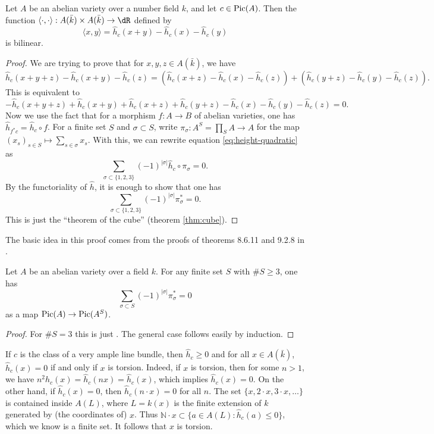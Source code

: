 \documentclass{article}
\begin{document}
\begin{lemma}\label{lem:height-quadratic}
Let $A$ be an abelian variety over a number field $k$, and let $c\in \operatorname{Pic}(A)$. 
Then the function 
$\langle \cdot,\cdot\rangle:A(\bar k)\times A(\bar k)\to \dR$ defined by 
\[
  \langle x,y\rangle = \widehat h_c(x+y)-\widehat h_c(x)-\widehat h_c(y)
\]
is bilinear. 
\end{lemma}
\begin{proof}
We are trying to prove that for $x,y,z\in A(\bar k)$, we have 
\[
  \widehat h_c(x+y+z)-\widehat h_c(x+y)-\widehat h_c(z) = \left(\widehat h_c(x+z)-\widehat h_c(x)-\widehat h_c(z)\right) + \left(\widehat h_c(y+z)-\widehat h_c(y)-\widehat h_c(z)\right) \text{.}
\]
This is equivalent to 
\begin{equation}\label{eq:height-quadratic}
  -\widehat h_c(x+y+z)+\widehat h_c(x+y)+\widehat h_c(x+z)+\widehat h_c(y+z)-\widehat h_c(x)-\widehat h_c(y)-\widehat h_c(z) = 0 \text{.}
\end{equation}
Now we use the fact that for a morphism $f:A\to B$ of abelian varieties, one has 
$\widehat h_{f^\ast c}=\widehat h_c\circ f$. For a finite set $S$ and 
$\sigma\subset S$, write $\pi_\sigma:A^S=\prod_S A\to A$ for the map 
$(x_s)_{s\in S}\mapsto \sum_{s\in\sigma} x_s$. With this, we can rewrite 
equation \eqref{eq:height-quadratic} as 
\[
  \sum_{\sigma\subset \{1,2,3\}} (-1)^{|\sigma|}\widehat h_c\circ \pi_\sigma = 0 \text{.}
\]
By the functoriality of $\widehat h$, it is enough to show that one has 
\[
  \sum_{\sigma\subset \{1,2,3\}} (-1)^{|\sigma|} \pi_\sigma^\ast = 0 \text{.}
\]
This is just the ``theorem of the cube'' (theorem \ref{thm:cube}). 
\end{proof}

The basic idea in this proof comes from the proofs of theorems 8.6.11 and 
9.2.8 in \cite{bg06}. 

\begin{theorem}\label{thm:cube}
Let $A$ be an abelian variety over a field $k$. For any finite set $S$ with 
$\# S\geqslant 3$, one has 
\[
  \sum_{\sigma\subset S} (-1)^{|\sigma|} \pi_\sigma^\ast = 0
\]
as a map $\operatorname{Pic}(A)\to \operatorname{Pic}(A^S)$. 
\end{theorem}
\begin{proof}
For $\# S=3$ this is just \cite[III.10]{mu08}. The general case follows easily 
by induction. 
\end{proof}



If $c$ is the class of a very ample line bundle, then 
$\widehat h_c\geqslant 0$ and for all $x\in A(\bar k)$, 
$\widehat h_c(x)=0$ if and only if $x$ is torsion. 
Indeed, if $x$ is torsion, then for some $n>1$, we have 
$n^2 \widehat h_c(x)=\widehat h_c(n x)=\widehat h_c(x)$, which implies 
$\widehat h_c(x)=0$. On the other hand, if $\widehat h_c(x)=0$, then 
$\widehat h_c(n\cdot x)=0$ for all $n$. The set 
$\{x,2\cdot x,3\cdot x,\dots\}$ is contained inside $A(L)$, where $L=k(x)$ is 
the finite extension of $k$ generated by (the coordinates of) $x$. Thus 
$\mathbb{N}\cdot x\subset \{a\in A(L):\widehat h_c(a)\leqslant 0\}$, which we 
know is a finite set. It follows that $x$ is torsion. 
\end{document}
